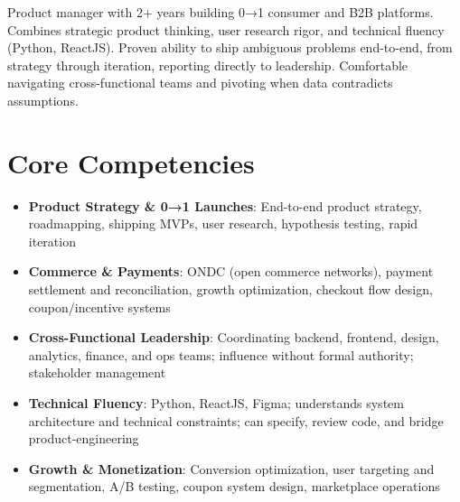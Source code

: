 \documentclass[11pt,a4paper,sans]{moderncv}
\begin{document}
\makecvtitle


\vspace{6pt}
\small{Product manager with 2+ years building 0→1 consumer and B2B platforms. Combines strategic product thinking, user research rigor, and technical fluency (Python, ReactJS). Proven ability to ship ambiguous problems end-to-end, from strategy through iteration, reporting directly to leadership. Comfortable navigating cross-functional teams and pivoting when data contradicts assumptions.}


\section{Core Competencies}
\vspace{1pt}
\begin{itemize}

\item \textbf{Product Strategy \& 0→1 Launches}: End-to-end product strategy, roadmapping, shipping MVPs, user research, hypothesis testing, rapid iteration

\item \textbf{Commerce \& Payments}: ONDC (open commerce networks), payment settlement and reconciliation, growth optimization, checkout flow design, coupon/incentive systems

\item \textbf{Cross-Functional Leadership}: Coordinating backend, frontend, design, analytics, finance, and ops teams; influence without formal authority; stakeholder management

\item \textbf{Technical Fluency}: Python, ReactJS, Figma; understands system architecture and technical constraints; can specify, review code, and bridge product-engineering

\item \textbf{Growth & Monetization}: Conversion optimization, user targeting and segmentation, A/B testing, coupon system design, marketplace operations

\end{itemize}

\end{document}

